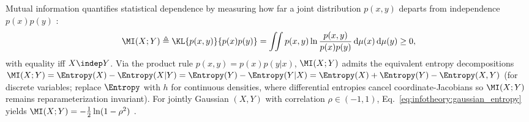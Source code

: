 \documentclass[../../../../master.tex]{subfiles}
\begin{document}
Mutual information quantifies statistical dependence by measuring how far a joint distribution $p(x, y)$ departs from independence $p(x)p(y)$  :
\begin{equation}
\label{eq:infotheory:mi_def}
  \MI(X; Y) \triangleq \KL{p(x, y)}{p(x)p(y)}
  = \iint p(x, y)\ln\frac{p(x, y)}{p(x)p(y)}\,\mathrm{d}\mu(x)\,\mathrm{d}\mu(y) \ge 0,
\end{equation}
with equality iff $X \indep Y$. Via the product rule $p(x, y) = p(x)p(y|x)$, $\MI(X; Y)$ admits the equivalent entropy decompositions $\MI(X; Y) = \Entropy(X) - \Entropy(X|Y) = \Entropy(Y) - \Entropy(Y|X) = \Entropy(X) + \Entropy(Y) - \Entropy(X, Y)$ (for discrete variables; replace $\Entropy$ with $h$ for continuous densities, where differential entropies cancel coordinate-Jacobians so $\MI(X; Y)$ remains reparameterization invariant). For jointly Gaussian $(X, Y)$ with correlation $\rho \in (-1, 1)$, Eq.~\eqref{eq:infotheory:gaussian_entropy} yields $\MI(X; Y) = -\frac{1}{2}\ln(1 - \rho^2)$ .
\end{document}
